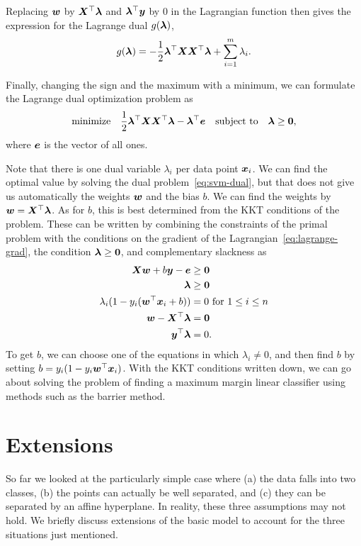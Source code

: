 Replacing $\bm{w}$ by $\bm{X}^{\top}\bm{\lambda}$ and $\bm{\lambda}^{\top}\bm{y}$ by $0$ in the Lagrangian function then gives the expression for the Lagrange dual $g(\bm{\lambda})$,
\begin{equation*}
  g(\bm{\lambda}) = -\frac{1}{2}\bm{\lambda}^{\top}\bm{X}\bm{X}^{\top}\bm{\lambda}+\sum_{i=1}^m \lambda_i.
\end{equation*}

Finally, changing the sign and the maximum with a minimum, we can formulate the Lagrange dual optimization problem as
\begin{equation}\label{eq:svm-dual}
\text{minimize}\quad \frac{1}{2}\bm{\lambda}^{\top}\bm{X}\bm{X}^{\top}\bm{\lambda}- \bm{\lambda}^{\top}\bm{e} \quad\text{subject to}\quad \bm{\lambda}\geq \bm{0},
\end{equation}
where $\bm{e}$ is the vector of all ones. 

Note that there is one dual variable $\lambda_i$ per data point $\bm{x}_i$. We can find the optimal value by solving the dual problem~\eqref{eq:svm-dual}, but that does not give us automatically the weights $\bm{w}$ and the bias $b$. We can find the weights by $\bm{w}=\bm{X}^{\top}\bm{\lambda}$. As for $b$, this is best determined from the KKT conditions of the problem. These can be written by combining the constraints of the primal problem with the conditions on the gradient of the Lagrangian~\eqref{eq:lagrange-grad}, the condition $\bm{\lambda}\geq \bm{0}$, and complementary slackness as
\begin{align*}
   \bm{X}\bm{w}+b\bm{y}-\bm{e} &\geq \bm{0}\\
   \bm{\lambda}&\geq \bm{0}\\
   \lambda_i (1-y_i(\bm{w}^{\top}\bm{x}_i+b)) &= 0 \text{ for } 1\leq i\leq n\\
   \bm{w}-\bm{X}^{\top}\bm{\lambda} &= \bm{0}\\
   \bm{y}^{\top}\bm{\lambda} &= 0.
\end{align*}
To get $b$, we can choose one of the equations in which $\lambda_i\neq 0$, and then find $b$ by setting $b= y_i(1-y_i\bm{w}^{\top}\bm{x}_i)$. With the KKT conditions written down, we can go about solving the problem of finding a maximum margin linear classifier using methods such as the barrier method.

\section{Extensions}
So far we looked at the particularly simple case where (a) the data falls into two classes, (b) the points can actually be well separated, and (c) they can be separated by an affine hyperplane. In reality, these three assumptions may not hold. We briefly discuss extensions of the basic model to account for the three situations just mentioned.

